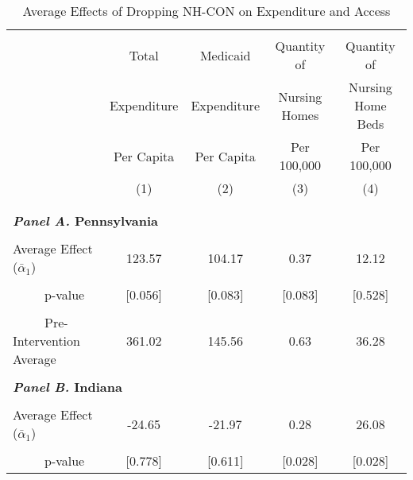 \documentclass[../Main.tex]{subfiles}
\begin{document}
\newpage
\null
\vfill
\begin{table}[htbp]\centering \footnotesize
\def\sym#1{\ifmmode^{#1}\else\(^{#1}\)\fi}
\caption{Average Effects of Dropping NH-CON on Expenditure and Access}
\label{tab:ave_results}
\setlength{\tabcolsep}{10pt}
\begin{tabular}{l*{4}{c}}
\hline\hline
\\[-2ex]
&\multicolumn{1}{c}{Total}&\multicolumn{1}{c}{Medicaid}&\multicolumn{1}{c}{Quantity of}&\multicolumn{1}{c}{Quantity of}\\
&\multicolumn{1}{c}{Expenditure}&\multicolumn{1}{c}{Expenditure}&\multicolumn{1}{c}{Nursing Homes}&\multicolumn{1}{c}{Nursing Home Beds}\\
&\multicolumn{1}{c}{Per Capita}&\multicolumn{1}{c}{Per Capita}&\multicolumn{1}{c}{Per 100,000}&\multicolumn{1}{c}{Per 100,000}\\
&\multicolumn{1}{c}{(1)}&\multicolumn{1}{c}{(2)}&\multicolumn{1}{c}{(3)}&\multicolumn{1}{c}{(4)}\\
\\[-2ex]
\hline
\\[-.1ex]
\multicolumn{5}{l}{\textbf{\textit{Panel A.} Pennsylvania}}\\
\\[-1.5ex]
\multicolumn{1}{l}{Average Effect ($\bar{\alpha}_1$)}&   \multicolumn{1}{c}{123.57}&   \multicolumn{1}{c}{104.17}&  \multicolumn{1}{c}{0.37}&   \multicolumn{1}{c}{12.12}\\
\\[-2ex]
\multicolumn{1}{l}{\ \ \ \ \ p-value}  &\multicolumn{1}{c}{[0.056]}&\multicolumn{1}{c}{[0.083]}&\multicolumn{1}{c}{[0.083]}&\multicolumn{1}{c}{[0.528]}\\
\\[-2ex]
\multicolumn{1}{l}{\ \ \ \ \ Pre-Intervention Average}&   \multicolumn{1}{c}{361.02}&   \multicolumn{1}{c}{145.56}&   \multicolumn{1}{c}{0.63}&   \multicolumn{1}{c}{36.28}\\
\\[-.1ex]
\multicolumn{5}{l}{\textbf{\textit{Panel B.} Indiana}}\\
\\[-1.5ex]
\multicolumn{1}{l}{Average Effect ($\bar{\alpha}_1$)}&   \multicolumn{1}{c}{-24.65}&   \multicolumn{1}{c}{-21.97}&  \multicolumn{1}{c}{0.28}&   \multicolumn{1}{c}{26.08}\\
\\[-2ex]
\multicolumn{1}{l}{\ \ \ \ \ p-value}  &\multicolumn{1}{c}{[0.778]}&\multicolumn{1}{c}{[0.611]}&\multicolumn{1}{c}{[0.028]}&\multicolumn{1}{c}{[0.028]}\\

\end{tabular}
\end{table}
\end{document}
